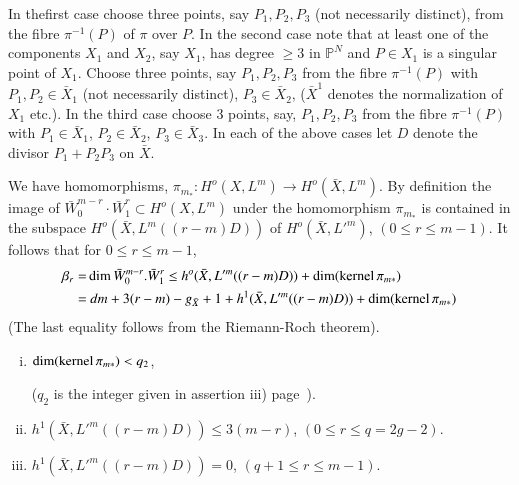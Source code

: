 \noindent
In the\pageoriginale first case choose three points, say $P_1, P_2,
P_3$ (not necessarily distinct), from the fibre $\pi^{-1} (P)$ of
$\pi$ over 
$P$. In the second case note that at least one of the components $X_1$
and $X_2$, say $X_1$, has degree $\ge 3$ in $\mathbb{P}^N$ and $P
\in X_1$ is a singular point of $X_1$. Choose three points,
say $P_1, P_2, P_3$ from the fibre $\pi^{-1}(P)$ with $P_1, P_2
\in \bar{X}_1$ (not necessarily distinct), $P_3 \in
\bar{X}_2$, ($\bar{X}^1$ denotes the normalization of $X_1$ etc.). In
the third case choose 3 points, say, $P_1, P_2, P_3$ from the fibre
$\pi^{-1}(P)$ with $P_1 \in \bar{X}_1$, $P_2 \in
\bar{X}_2$, $P_3 \in \bar{X}_3$. In each of the above cases let
$D$ denote the divisor $P_1 + P_2 P_3$ on $\bar{X}$. 

We have homomorphisms, $\pi_{m_*} : H^o (X, L^m) \to H^o (\bar{X},
L^m)$. By definition the image of $\bar{W}^{m-r}_{0} \cdot \bar{W}^r_1
\subset H^o (X, L^m)$ under the homomorphism $\pi_{m_*}$ is contained
in the subspace $H^o (\bar{X}, L^m ((r-m)D))$ of $H^o (\bar{X},
L'^{m})$, $(0 \le r \le m-1)$. It follows that for $0 \le r \le m - 1$, 
\begin{align*}
\beta_r  = & \dim \bar{W}^{m-r}_{0}. \bar{W}^r_1 \le h^o (\bar{X},
L'^{m}((r-m)D)) + \dim (\operatorname{kernel}  \pi_{m*})\\ 
= & ~ dm + 3(r-m) - g_{\bar{X}} + 1 + h^1 (\bar{X}, L'^{m} (( r-m)D)) +
\dim (\operatorname{kernel}  \pi_{m*} )
\end{align*}
(The last equality follows from the Riemann-Roch theorem).

\begin{claim*}\label{c1:claim}
\begin{enumerate}[i)]
\item $\dim(\operatorname{kernel} \pi_{m*}) < q_2$,

 ($q_2$ is the integer given in assertion iii) page~\pageref{c1:as3}). 

\item $h^1 (\bar{X}, L'^m ((r-m)D)) \le 3(m-r)$, \quad $(0 \le r \le q = 2g -
  2)$.
 
\item $h^1 (\bar{X}, L'^m (( r - m)D)) = 0$, \quad $(q+1 \le r \le m-1)$.
\end{enumerate}
\end{claim*}

